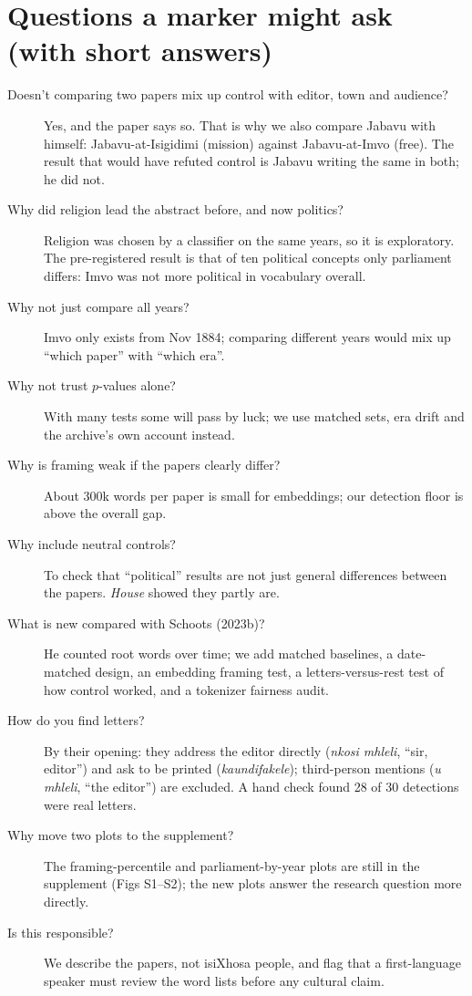 \documentclass[11pt]{article}
\begin{document}
\section{Questions a marker might ask (with short answers)}
\begin{description}
\item[Doesn't comparing two papers mix up control with editor, town and audience?] Yes, and the paper says so. That is why we also compare Jabavu with himself: Jabavu-at-Isigidimi (mission) against Jabavu-at-Imvo (free). The result that would have refuted control is Jabavu writing the same in both; he did not.
\item[Why did religion lead the abstract before, and now politics?] Religion was chosen by a classifier on the same years, so it is exploratory. The pre-registered result is that of ten political concepts only parliament differs: Imvo was not more political in vocabulary overall.
\item[Why not just compare all years?] Imvo only exists from Nov 1884; comparing different years would mix up ``which paper'' with ``which era''.
\item[Why not trust $p$-values alone?] With many tests some will pass by luck; we use matched sets, era drift and the archive's own account instead.
\item[Why is framing weak if the papers clearly differ?] About 300k words per paper is small for embeddings; our detection floor is above the overall gap.
\item[Why include neutral controls?] To check that ``political'' results are not just general differences between the papers. \emph{House} showed they partly are.
\item[What is new compared with Schoots (2023b)?] He counted root words over time; we add matched baselines, a date-matched design, an embedding framing test, a letters-versus-rest test of how control worked, and a tokenizer fairness audit.
\item[How do you find letters?] By their opening: they address the editor directly (\emph{nkosi mhleli}, ``sir, editor'') and ask to be printed (\emph{kaundifakele}); third-person mentions (\emph{u mhleli}, ``the editor'') are excluded. A hand check found 28 of 30 detections were real letters.
\item[Why move two plots to the supplement?] The framing-percentile and parliament-by-year plots are still in the supplement (Figs S1--S2); the new plots answer the research question more directly.
\item[Is this responsible?] We describe the papers, not isiXhosa people, and flag that a first-language speaker must review the word lists before any cultural claim.
\end{description}
\end{document}
